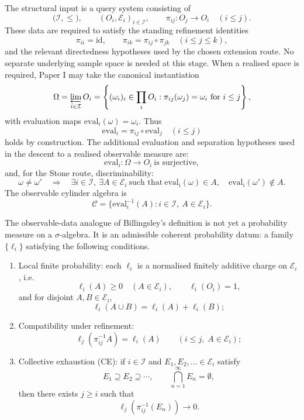 \documentclass[11pt]{article}
\begin{document}
The structural input is a query system consisting of
\[
  \bigl(\mathcal I,\le\bigr),
  \qquad
  (O_i,\mathcal E_i)_{i\in\mathcal I},
  \qquad
  \pi_{ij}:O_j\to O_i\quad(i\le j).
\]
These data are required to satisfy the standing refinement identities
\[
  \pi_{ii}=\mathrm{id},\qquad
  \pi_{ik}=\pi_{ij}\circ\pi_{jk}\quad(i\le j\le k),
\]
and the relevant directedness hypotheses used by the chosen extension route.
No separate underlying sample space is needed at this stage.  When a realised
space is required, Paper I may take the canonical instantiation
\[
  \Omega
  =
  \varprojlim_{i\in\mathcal I}O_i
  =
  \left\{
    (\omega_i)_i\in\prod_i O_i:
    \pi_{ij}(\omega_j)=\omega_i\ \text{for }i\le j
  \right\},
\]
with evaluation maps $\mathrm{eval}_i(\omega)=\omega_i$.  Thus
\[
  \mathrm{eval}_i=\pi_{ij}\circ\mathrm{eval}_j\quad(i\le j)
\]
holds by construction.  The additional evaluation and separation hypotheses
used in the descent to a realised observable measure are:
\[
  \mathrm{eval}_i:\Omega\to O_i\ \text{is surjective},
\]
and, for the Stone route, discriminability:
\[
  \omega\ne\omega'
  \quad\Longrightarrow\quad
  \exists i\in\mathcal I,\ \exists A\in\mathcal E_i
  \ \text{such that}\
  \mathrm{eval}_i(\omega)\in A,\quad
  \mathrm{eval}_i(\omega')\notin A.
\]
The observable cylinder algebra is
\[
  \mathcal C
  =
  \{\mathrm{eval}_i^{-1}(A):i\in\mathcal I,\ A\in\mathcal E_i\}.
\]

The observable-data analogue of Billingsley's definition is not yet a
probability measure on a $\sigma$-algebra.  It is an admissible coherent
probability datum: a family $\{\ell_i\}$ satisfying the following
conditions.
\begin{enumerate}
  \item[(i)] Local finite probability: each $\ell_i$ is a normalised finitely
  additive charge on $\mathcal E_i$, i.e.
  \[
    \ell_i(A) \ge 0 \quad (A \in \mathcal E_i),
    \qquad
    \ell_i(O_i)=1,
  \]
  and for disjoint $A,B \in \mathcal E_i$,
  \[
    \ell_i(A \cup B)=\ell_i(A)+\ell_i(B);
  \]

  \item[(ii)] Compatibility under refinement:
  \[
    \ell_j(\pi_{ij}^{-1}A)=\ell_i(A)
    \qquad
    (i \le j,\; A \in \mathcal E_i);
  \]

  \item[(iii)] Collective exhaustion (CE): if $i \in \mathcal I$ and
  $E_1,E_2,\ldots \in \mathcal E_i$ satisfy
  \[
    E_1 \supseteq E_2 \supseteq \cdots,
    \qquad
    \bigcap_{n=1}^{\infty} E_n = \emptyset,
  \]
  then there exists $j \ge i$ such that
  \[
    \ell_j\!\left(\pi_{ij}^{-1}(E_n)\right) \longrightarrow 0.
  \]
\end{enumerate}
\end{document}
